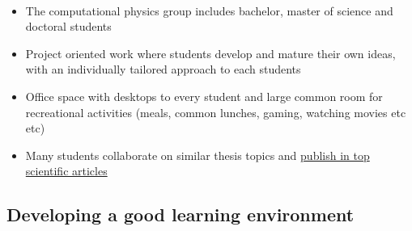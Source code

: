 \documentclass[%
twoside,                 %
final,                   %
10pt]{article}
\begin{document}
\paragraph{}
\begin{itemize}
\item The computational physics group includes bachelor, master of science and doctoral students

\item Project oriented work where students develop and mature their own ideas, with an individually tailored approach to each students

\item Office space with desktops to every student and large common room for recreational activities (meals, common lunches, gaming, watching movies etc etc)

\item Many students collaborate on similar  thesis topics and \href{{http://www.dn.no/talent/2014/06/12/Utdannelse/sommervikar-ble-toppforsker}}{publish in top scientific articles}
\end{itemize}

\noindent





\subsection*{Developing a good learning environment}

\end{document}
